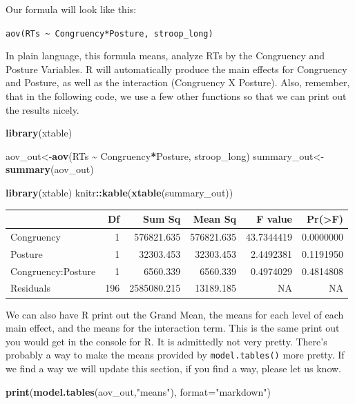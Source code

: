 \documentclass[
]{book}
\newenvironment{Shaded}{\begin{snugshade}}{\end{snugshade}}
\newcommand{\AttributeTok}[1]{\textcolor[rgb]{0.13,0.29,0.53}{#1}}
\newcommand{\FunctionTok}[1]{\textcolor[rgb]{0.13,0.29,0.53}{\textbf{#1}}}
\newcommand{\NormalTok}[1]{#1}
\newcommand{\OtherTok}[1]{\textcolor[rgb]{0.56,0.35,0.01}{#1}}
\newcommand{\SpecialCharTok}[1]{\textcolor[rgb]{0.81,0.36,0.00}{\textbf{#1}}}
\newcommand{\StringTok}[1]{\textcolor[rgb]{0.31,0.60,0.02}{#1}}
\begin{document}
Our formula will look like this:

\texttt{aov(RTs\ \textasciitilde{}\ Congruency*Posture,\ stroop\_long)}

In plain language, this formula means, analyze RTs by the Congruency and Posture Variables. R will automatically produce the main effects for Congruency and Posture, as well as the interaction (Congruency X Posture). Also, remember, that in the following code, we use a few other functions so that we can print out the results nicely.

\begin{Shaded}
\begin{Highlighting}[]
\FunctionTok{library}\NormalTok{(xtable)}

\NormalTok{aov\_out}\OtherTok{\textless{}{-}}\FunctionTok{aov}\NormalTok{(RTs }\SpecialCharTok{\textasciitilde{}}\NormalTok{ Congruency}\SpecialCharTok{*}\NormalTok{Posture, stroop\_long)}
\NormalTok{summary\_out}\OtherTok{\textless{}{-}}\FunctionTok{summary}\NormalTok{(aov\_out)}

\FunctionTok{library}\NormalTok{(xtable)}
\NormalTok{knitr}\SpecialCharTok{::}\FunctionTok{kable}\NormalTok{(}\FunctionTok{xtable}\NormalTok{(summary\_out))}
\end{Highlighting}
\end{Shaded}

\begin{tabular}{l|r|r|r|r|r}
\hline
  & Df & Sum Sq & Mean Sq & F value & Pr(>F)\\
\hline
Congruency & 1 & 576821.635 & 576821.635 & 43.7344419 & 0.0000000\\
\hline
Posture & 1 & 32303.453 & 32303.453 & 2.4492381 & 0.1191950\\
\hline
Congruency:Posture & 1 & 6560.339 & 6560.339 & 0.4974029 & 0.4814808\\
\hline
Residuals & 196 & 2585080.215 & 13189.185 & NA & NA\\
\hline
\end{tabular}

We can also have R print out the Grand Mean, the means for each level of each main effect, and the means for the interaction term. This is the same print out you would get in the console for R. It is admittedly not very pretty. There's probably a way to make the means provided by \texttt{model.tables()} more pretty. If we find a way we will update this section, if you find a way, please let us know.

\begin{Shaded}
\begin{Highlighting}[]
\FunctionTok{print}\NormalTok{(}\FunctionTok{model.tables}\NormalTok{(aov\_out,}\StringTok{"means"}\NormalTok{), }\AttributeTok{format=}\StringTok{"markdown"}\NormalTok{)}
\end{Highlighting}
\end{Shaded}
\end{document}
